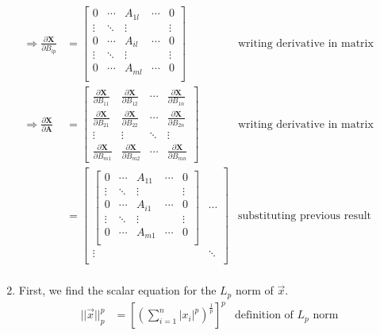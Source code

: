 \documentclass[11pt, fleqn]{article}
\newcommand{\pd}[2]{\frac{\partial #1}{\partial #2}}
\begin{document}
\begin{enumerate}
\begin{align*}
        \Rightarrow \pd{\textbf{X}}{B_{lp}} &= \begin{bmatrix}
            0 & \cdots & A_{1l} & \cdots & 0 \\
            \vdots & \ddots & \vdots & & \vdots \\
            0 & \cdots & A_{il} & \cdots & 0 \\
            \vdots & \ddots & \vdots & & \vdots \\
            0 & \cdots & A_{ml} & \cdots & 0 \\
        \end{bmatrix} & \text{writing derivative in matrix form} \\
        \Rightarrow \pd{\textbf{X}}{\textbf{A}} &= \begin{bmatrix}
            \pd{\textbf{X}}{B_{11}} & \pd{\textbf{X}}{B_{12}} & \cdots & \pd{\textbf{X}}{B_{1n}} \\
            \pd{\textbf{X}}{B_{21}} & \pd{\textbf{X}}{B_{22}} & \cdots & \pd{\textbf{X}}{B_{2n}} \\
            \vdots & \vdots & \ddots & \vdots \\
            \pd{\textbf{X}}{B_{m1}} & \pd{\textbf{X}}{B_{m2}} & \cdots & \pd{\textbf{X}}{B_{mn}}
        \end{bmatrix} & \text{writing derivative in matrix form} \\
        &= \begin{bmatrix}
            \begin{bmatrix}
                0 & \cdots & A_{11} & \cdots & 0 \\
                \vdots & \ddots & \vdots & & \vdots \\
                0 & \cdots & A_{i1} & \cdots & 0 \\
                \vdots & \ddots & \vdots & & \vdots \\
                0 & \cdots & A_{m1} & \cdots & 0 \\
            \end{bmatrix} & \cdots \\
            \vdots & \ddots \\
        \end{bmatrix} & \text{substituting previous result} \\
    \end{align*}
    \item First, we find the scalar equation for the $L_p$ norm of $\vec{x}$.
    \begin{align*}
        ||\vec{x}||_p^p &= \left[ \left(\sum_{i=1}^{n} |x_i|^p \right)^{\frac{1}{p}} \right]^p & \text{definition of } L_p \text{ norm} \\

\end{align*}
\end{enumerate}
\end{document}
